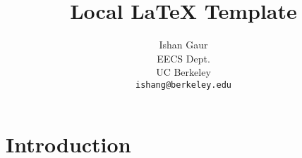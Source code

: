 \documentclass{article}
\title{Local LaTeX Template}
\author{
  Ishan Gaur \\
  EECS Dept.\\
  UC Berkeley\\
  \texttt{ishang@berkeley.edu} \\
}
\begin{document}
\maketitle

\section{Introduction}


\printbibliography
\end{document}
